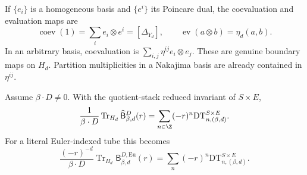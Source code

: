 If $\{e_i\}$ is a homogeneous basis and $\{e^i\}$ its Poincare dual,
the coevaluation and evaluation maps are
\[
 \operatorname{coev}(1)=\sum_i e_i\otimes e^i=[\Delta_{Y_d}],
 \qquad \operatorname{ev}(a\otimes b)=\eta_d(a,b).
\]
In an arbitrary basis, coevaluation is
$\sum_{i,j}\eta^{ij}e_i\otimes e_j$.
These are genuine boundary maps on $H_d$. Partition multiplicities in
a Nakajima basis are already contained in $\eta^{ij}$.

\begin{theorem}\label{rdt:thm:trace}
Assume $\beta\cdot D\ne0$. With the quotient-stack reduced invariant
of $S\times E$,
\begin{equation}\label{rdt:eq:trace}
 \frac{1}{\beta\cdot D}\operatorname{Tr}_{H_d}\widehat{\mathsf B}^D_{\beta,d}(r)
 =\sum_{n\in\Z}(-r)^n\mathrm{DT}^{S\times E}_{n,(\beta,d)}.
\end{equation}
For a literal Euler-indexed tube this becomes
\begin{equation}\label{rdt:eq:EuTrace}
 \frac{(-r)^{-d}}{\beta\cdot D}
 \operatorname{Tr}_{H_d}\mathsf B^{D,\mathrm{Eu}}_{\beta,d}(r)
 =\sum_n(-r)^n\mathrm{DT}^{S\times E}_{n,(\beta,d)}.
\end{equation}
\end{theorem}
